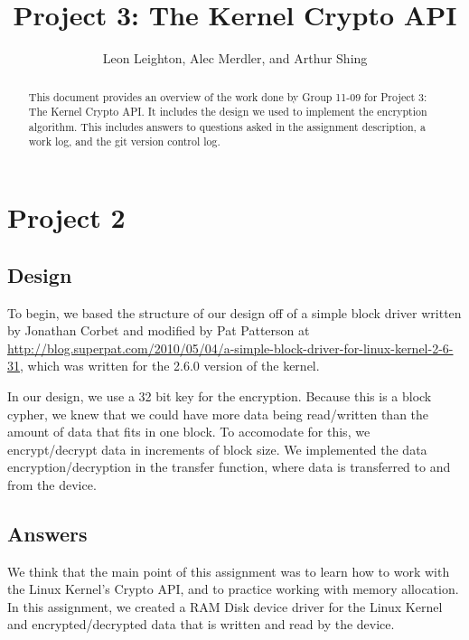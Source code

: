 \documentclass[journal, letterpaper, draftclsnofoot, onecolumn, 10pt]{IEEEtran}
\begin{document}
\title{Project 3: The Kernel Crypto API}
\author{Leon Leighton, Alec Merdler, and Arthur Shing}

\begin{titlepage}
    \centering
    \maketitle
    \begin{abstract}
      This document provides an overview of the work done by Group 11-09 for Project 3: The Kernel Crypto API.
      It includes the design we used to implement the encryption algorithm.
      This includes answers to questions asked in the assignment description, a work log, and the git version control log.
    \end{abstract}


\end{titlepage}
\tableofcontents
\clearpage

\section{Project 2}

\subsection{Design}
To begin, we based the structure of our design off of a simple block driver written by Jonathan Corbet and modified by Pat Patterson at \url{http://blog.superpat.com/2010/05/04/a-simple-block-driver-for-linux-kernel-2-6-31}, which was written for the 2.6.0 version of the kernel.

In our design, we use a 32 bit key for the encryption. Because this is a block cypher, we knew that we could have more data being read/written
than the amount of data that fits in one block. To accomodate for this, we encrypt/decrypt data in increments of block size.
We implemented the data encryption/decryption in the transfer function, where data is transferred to and from the device. \\


\subsection{Answers}


We think that the main point of this assignment was to learn how to work with the Linux Kernel's Crypto API, and to practice working with memory allocation.
In this assignment, we created a RAM Disk device driver for the Linux Kernel and encrypted/decrypted data that is written and read by the device. \\
\end{document}
